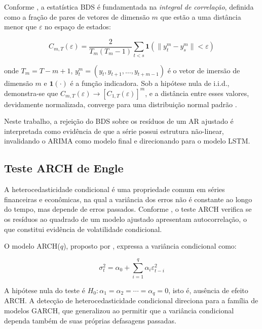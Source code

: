 \documentclass[
  12pt,
  openright,
  twoside,
  a4paper,
  english,
  brazil
]{abntex2}
\begin{document}
Conforme , a estatística BDS é fundamentada na \textit{integral de correlação}, definida como a fração de pares de vetores de dimensão $m$ que estão a uma distância menor que $\varepsilon$ no espaço de estados:

\begin{equation}
  C_{m,T}(\varepsilon) = \frac{2}{T_m(T_m - 1)} \sum_{t < s} \mathbf{1}\left(\|y_t^m - y_s^m\| < \varepsilon\right)
  \label{eq:integral-correlacao}
\end{equation}

onde $T_m = T - m + 1$, $y_t^m = (y_t, y_{t+1}, \ldots, y_{t+m-1})$ é o vetor de imersão de dimensão $m$ e $\mathbf{1}(\cdot)$ é a função indicadora. Sob a hipótese nula de i.i.d., demonstra-se que $C_{m,T}(\varepsilon) \to [C_{1,T}(\varepsilon)]^m$, e a distância entre esses valores, devidamente normalizada, converge para uma distribuição normal padrão \cite{broock1996test}.

Neste trabalho, a rejeição do BDS sobre os resíduos de um AR ajustado é interpretada como evidência de que a série possui estrutura não-linear, invalidando o ARIMA como modelo final e direcionando para o modelo LSTM.

\subsection{Teste ARCH de Engle}
\label{subsec:arch}

A heterocedasticidade condicional é uma propriedade comum em séries financeiras e econômicas, na qual a variância dos erros não é constante ao longo do tempo, mas depende de erros passados. Conforme , o teste ARCH verifica se os resíduos ao quadrado de um modelo ajustado apresentam autocorrelação, o que constitui evidência de volatilidade condicional.

O modelo ARCH($q$), proposto por , expressa a variância condicional como:

\begin{equation}
  \sigma_t^2 = \alpha_0 + \sum_{i=1}^{q} \alpha_i \varepsilon_{t-i}^2
  \label{eq:arch}
\end{equation}

A hipótese nula do teste é $H_0: \alpha_1 = \alpha_2 = \cdots = \alpha_q = 0$, isto é, ausência de efeito ARCH. A detecção de heterocedasticidade condicional direciona para a família de modelos GARCH, que  generalizou ao permitir que a variância condicional dependa também de suas próprias defasagens passadas.
\end{document}
